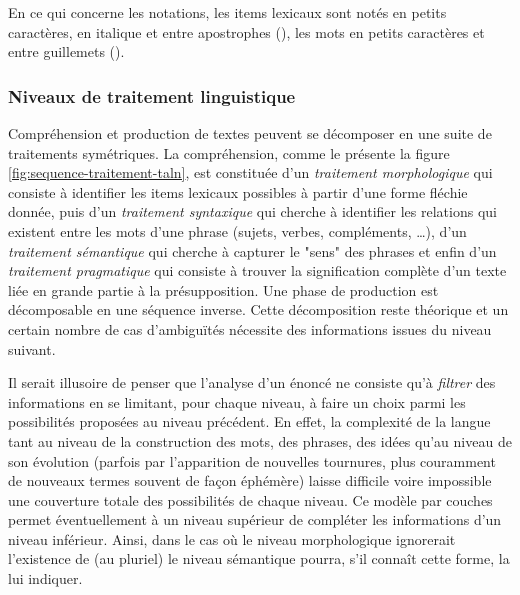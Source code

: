 En ce qui concerne les notations, les items lexicaux sont notés en
petits caractères, en italique et entre apostrophes (),
les mots en petits caractères et entre guillemets ().

\subsubsection{Niveaux de traitement linguistique}
\label{sec:niveaux}

Compréhension et production de textes peuvent se décomposer en une
suite de traitements symétriques. La compréhension, comme le présente
la figure \ref{fig:sequence-traitement-taln}, est constituée d'un
\emph{traitement morphologique} qui consiste à identifier les items
lexicaux possibles à partir d'une forme fléchie donnée, puis d'un
\emph{traitement syntaxique} qui cherche à identifier les relations
qui existent entre les mots d'une phrase (sujets, verbes, compléments,
\ldots), d'un \emph{traitement sémantique} qui cherche à capturer le
"sens" des phrases et enfin d'un \emph{traitement pragmatique} qui
consiste à trouver la signification complète d'un texte liée en grande
partie à la présupposition. Une phase de production est décomposable
en une séquence inverse. Cette décomposition reste théorique et un
certain nombre de cas d'ambiguïtés nécessite des informations issues
du niveau suivant.

Il serait illusoire de penser que l'analyse d'un énoncé ne consiste qu'à \emph{filtrer} des informations en se limitant, pour chaque niveau, à faire un choix parmi les possibilités
proposées au niveau précédent. En
effet, la complexité de la langue tant au niveau de la construction
des mots, des phrases, des idées qu'au niveau de son évolution
(parfois par l'apparition de nouvelles tournures, plus couramment de
nouveaux termes souvent de façon éphémère) laisse difficile voire
impossible une couverture totale des possibilités de chaque niveau. Ce
modèle par couches permet éventuellement à un niveau supérieur de
compléter les informations d'un niveau inférieur. Ainsi, dans le cas
où le niveau morphologique ignorerait l'existence de 
(au pluriel) le niveau sémantique pourra, s'il connaît cette forme, la
lui indiquer.


